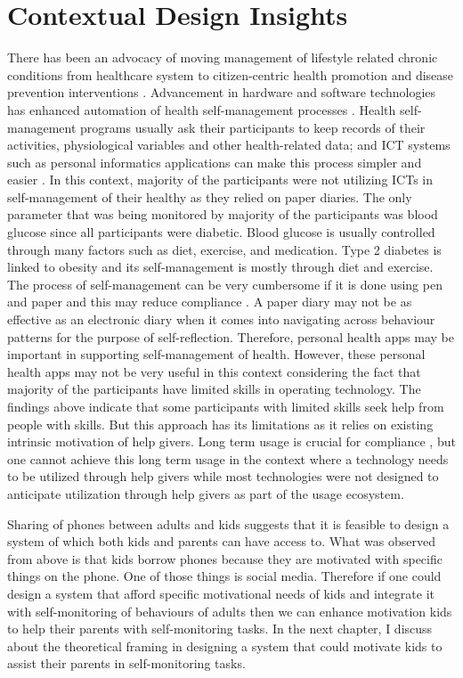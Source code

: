 \section{Contextual Design Insights}
There has been an advocacy of moving management of lifestyle related chronic conditions from healthcare system to citizen-centric health promotion and disease prevention interventions \citep{korhonen2010personal}. Advancement in hardware and software technologies has enhanced automation of health self-management processes \citep{arsand:mobile}. Health self-management programs usually ask their participants to keep records of their activities, physiological variables and other health-related data; and ICT systems such as personal informatics applications can make this process simpler and easier \citep{medynskiy2010salud}. In this context, majority of the participants were not utilizing ICTs in self-management of their healthy as they relied on paper diaries. The only parameter that was being monitored by majority of the participants was blood glucose since all participants were diabetic. Blood glucose is usually controlled through many factors such as diet, exercise, and medication. Type 2 diabetes is linked to obesity and its self-management is mostly through diet and exercise.  The process of self-management can be very cumbersome if it is done using pen and paper and this may reduce compliance \citep{mattila2008mobile}. A paper diary may not be as effective as an electronic diary when it comes into navigating across behaviour patterns for the purpose of self-reflection. Therefore, personal health apps may be important in supporting self-management of health. However, these personal health apps may not be very useful in this context considering the fact that majority of the participants have limited skills in operating technology. The findings above indicate that some participants with limited skills seek help from people with skills. But this approach has its limitations as it relies on existing intrinsic motivation of help givers. Long term usage is crucial for compliance \citep{mattila2008mobile}, but one cannot achieve this long term usage in the context where a technology needs to be utilized through help givers while most technologies were not designed to anticipate utilization through help givers as part of the usage ecosystem.

Sharing of phones between adults and kids suggests that it is feasible to design a system of which both kids and parents can have access to. What was observed from above is that kids borrow phones because they are motivated with specific things on the phone. One of those things is social media. Therefore if one could design a system that afford specific motivational needs of kids and integrate it with self-monitoring of behaviours of adults then we can enhance motivation kids to help their parents with self-monitoring tasks. In the next chapter, I discuss about the theoretical framing in designing a system that could motivate kids to assist their parents in self-monitoring tasks.

\begin{flushright}
\end{flushright}